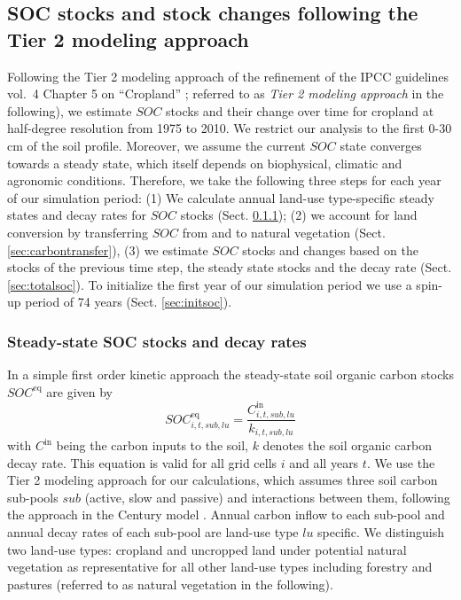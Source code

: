 \documentclass[gc, manuscript]{copernicus}
\begin{document}
\hypertarget{sec:carbonbudget}{%
\subsection{SOC stocks and stock changes following the Tier 2 modeling approach}\label{sec:carbonbudget}}

Following the Tier 2 modeling approach of the refinement of the IPCC guidelines vol.~4 Chapter 5 on ``Cropland'' \citep{ogle_cropland_in_ipcc_2019}; referred to as \textit{Tier 2 modeling approach} in the following), we estimate \(SOC\) stocks and their change over time for cropland at half-degree resolution from 1975 to 2010. We restrict our analysis to the first 0-30 cm of the soil profile. Moreover, we assume the current \(SOC\) state converges towards a steady state, which itself depends on biophysical, climatic and agronomic conditions.
Therefore, we take the following three steps for each year of our simulation period:
(1) We calculate annual land-use type-specific steady states and decay rates for \(SOC\) stocks (Sect. \ref{sec:steadystates});
(2) we account for land conversion by transferring \(SOC\) from and to natural vegetation (Sect. \ref{sec:carbontransfer}),
(3) we estimate \(SOC\) stocks and changes based on the stocks of the previous time step, the steady state stocks and the decay rate (Sect. \ref{sec:totalsoc}).
To initialize the first year of our simulation period we use a spin-up period of 74 years (Sect. \ref{sec:initsoc}).

\hypertarget{sec:steadystates}{%
\subsubsection{Steady-state SOC stocks and decay rates}\label{sec:steadystates}}

In a simple first order kinetic approach the steady-state soil organic carbon stocks \(SOC^{\mathrm{eq}}\) are given by
\begin{equation}
SOC^{\mathrm{eq}}_{i,t,sub,lu} =\frac{C^{\mathrm{in}}_{i,t,sub,lu}}{k_{i,t,sub,lu}}
\label{eq:inoutflow}
\end{equation}
with \(C^{\textrm{in}}\) being the carbon inputs to the soil, \(k\) denotes the soil organic carbon decay rate. This equation is valid for all grid cells \(i\) and all years \(t\). We use the Tier 2 modeling approach for our calculations, which assumes three soil carbon sub-pools \(sub\) (active, slow and passive) and interactions between them, following the approach in the Century model \citep{parton_analysis_1987}. Annual carbon inflow to each sub-pool and annual decay rates of each sub-pool are land-use type \(lu\) specific.
We distinguish two land-use types: cropland and uncropped land under potential natural vegetation as representative for all other land-use types including forestry and pastures (referred to as natural vegetation in the following).
\end{document}

